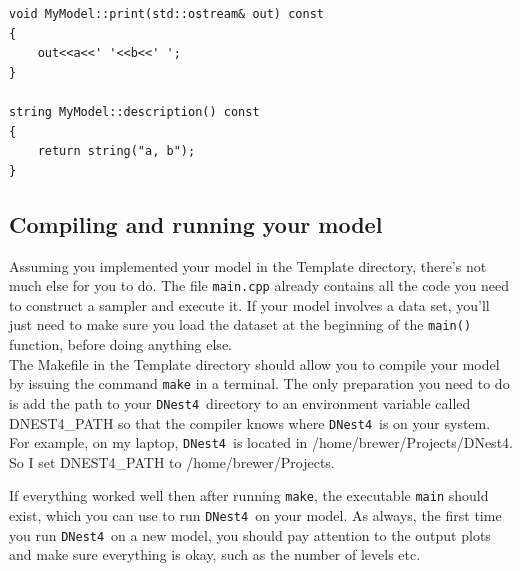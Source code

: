 \documentclass[a4paper, 11pt]{article}
\newcommand{\dnest}{{\tt DNest4}}
\begin{document}
\begin{framed}
\begin{verbatim}
void MyModel::print(std::ostream& out) const
{
    out<<a<<' '<<b<<' ';
}

string MyModel::description() const
{
    return string("a, b");
}
\end{verbatim}
\end{framed}

\subsection{Compiling and running your model}
Assuming you implemented your model in the Template directory, there's not
much else for you to do. The file {\tt main.cpp} already contains all the code
you need to construct a sampler and execute it. If your model involves a data
set, you'll just need to make sure you load the dataset at the beginning
of the {\tt main()} function, before doing anything else.\\

The Makefile in the Template directory should allow you to compile your model
by issuing the command {\tt make} in a terminal. The only preparation you need
to do is add the path to your \dnest~directory to an environment variable called
DNEST4\_PATH so that the compiler knows where \dnest~is on your system.
For example, on my laptop, \dnest~is located in /home/brewer/Projects/DNest4.
So I set DNEST4\_PATH to /home/brewer/Projects.

If everything worked well then after running {\tt make},
the executable {\tt main} should exist, which you can use to run
\dnest~on your model. As always, the first time you run \dnest~on a new model,
you should pay attention to the output plots and make sure everything is okay,
such as the number of levels etc.


\end{document}
